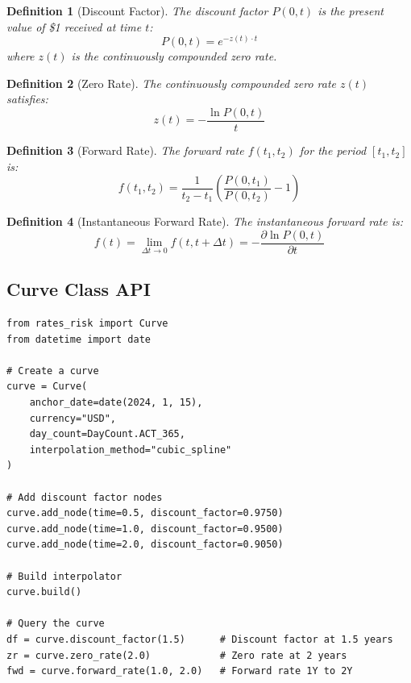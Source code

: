 \documentclass[12pt,a4paper]{report}
\newtheorem{definition}{Definition}[chapter]
\begin{document}
\begin{definition}[Discount Factor]
The discount factor $P(0,t)$ is the present value of \$1 received at time $t$:
\begin{equation}
    P(0,t) = e^{-z(t) \cdot t}
\end{equation}
where $z(t)$ is the continuously compounded zero rate.
\end{definition}

\begin{definition}[Zero Rate]
The continuously compounded zero rate $z(t)$ satisfies:
\begin{equation}
    z(t) = -\frac{\ln P(0,t)}{t}
\end{equation}
\end{definition}

\begin{definition}[Forward Rate]
The forward rate $f(t_1, t_2)$ for the period $[t_1, t_2]$ is:
\begin{equation}
    f(t_1, t_2) = \frac{1}{t_2 - t_1} \left( \frac{P(0,t_1)}{P(0,t_2)} - 1 \right)
\end{equation}
\end{definition}

\begin{definition}[Instantaneous Forward Rate]
The instantaneous forward rate is:
\begin{equation}
    f(t) = \lim_{\Delta t \to 0} f(t, t+\Delta t) = -\frac{\partial \ln P(0,t)}{\partial t}
\end{equation}
\end{definition}

\subsection{Curve Class API}

\begin{lstlisting}
from rates_risk import Curve
from datetime import date

# Create a curve
curve = Curve(
    anchor_date=date(2024, 1, 15),
    currency="USD",
    day_count=DayCount.ACT_365,
    interpolation_method="cubic_spline"
)

# Add discount factor nodes
curve.add_node(time=0.5, discount_factor=0.9750)
curve.add_node(time=1.0, discount_factor=0.9500)
curve.add_node(time=2.0, discount_factor=0.9050)

# Build interpolator
curve.build()

# Query the curve
df = curve.discount_factor(1.5)      # Discount factor at 1.5 years
zr = curve.zero_rate(2.0)            # Zero rate at 2 years
fwd = curve.forward_rate(1.0, 2.0)   # Forward rate 1Y to 2Y
\end{lstlisting}
\end{document}
